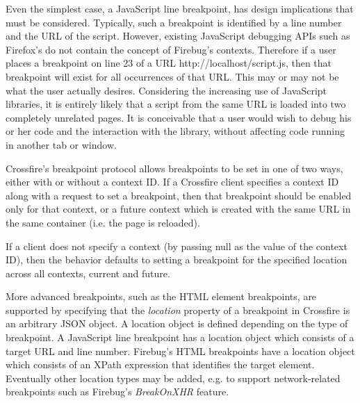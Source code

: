 Even the simplest case, a JavaScript line breakpoint, has design implications
that must be considered. Typically, such a breakpoint is identified by a line
number and the URL of the script. However, existing JavaScript debugging APIs
such as Firefox's do not contain the concept of Firebug's contexts.  Therefore
if a user places a breakpoint on line 23 of a URL http://localhost/script.js,
then that breakpoint will exist for all occurrences of that URL. This may or may
not be what the user actually desires.  Considering the increasing use of
JavaScript libraries, it is entirely likely that a script from the same URL is
loaded into two completely unrelated pages. It is conceivable that a user would
wish to debug his or her code and the interaction with the library, without
affecting code running in another tab or window.

Crossfire's breakpoint protocol allows breakpoints to be set in one of two ways,
either with or without a context ID. If a Crossfire client specifies a context
ID along with a request to set a breakpoint, then that breakpoint should be
enabled only for that context, or a future context which is created with the
same URL in the same container (i.e. the page is reloaded).

If a client does not specify a context (by passing null as the value of the
context ID), then the behavior defaults to setting a breakpoint for the
specified location across all contexts, current and future.

More advanced breakpoints, such as the HTML element breakpoints, are supported
by specifying that the \textit{location} property of a breakpoint in Crossfire
is an arbitrary JSON object. A location object is defined depending on
the type of breakpoint.  A JavaScript line breakpoint has a location object
which consists of a target URL and line number. Firebug's HTML breakpoints have
a location object which consists of an XPath expression that identifies the
target element.  Eventually other location types may be added, e.g. to support
network-related breakpoints such as Firebug's \textit{BreakOnXHR} feature.
